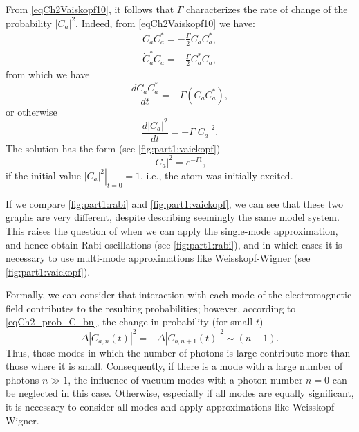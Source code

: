 From \eqref{eqCh2Vaiskopf10}, it follows that $\Gamma$ characterizes the rate of change of the probability $\left|C_{a}\right|^2$. Indeed, from \eqref{eqCh2Vaiskopf10} we have:
\begin{eqnarray}
\dot{C}_{a}C_{a}^{*} = - \frac{\Gamma}{2}C_{a}C_{a}^{*},
\nonumber \\
\dot{C}_{a}^{*}C_{a} = - \frac{\Gamma}{2}C_{a}^{*}C_{a},
\nonumber
\end{eqnarray}
from which we have
\begin{equation}
\frac{d C_{a}C_{a}^{*}}{dt} = -\Gamma \left(C_{a}C_{a}^{*}\right),
\nonumber
\end{equation}
or otherwise
\begin{equation}
\frac{d \left|C_{a}\right|^2}{dt} = -\Gamma \left|C_{a}\right|^2.
\nonumber
\end{equation}
The solution has the form (see \autoref{fig:part1:vaickopf})
\[
\left|C_{a}\right|^2 = e^{- \Gamma t},
\]
if the initial value $\left.\left|C_{a}\right|^2\right|_{t = 0} =
1$, i.e., the atom was initially excited.

 

\begin{remark}
If we compare \autoref{fig:part1:rabi} and
\autoref{fig:part1:vaickopf}, we can see that these two graphs are very different, despite describing seemingly the same model system. This raises the question of when we can apply the single-mode approximation, and hence obtain Rabi oscillations (see \autoref{fig:part1:rabi}), and in which cases it is necessary to use multi-mode approximations like Weisskopf-Wigner (see \autoref{fig:part1:vaickopf}). 

Formally, we can consider that interaction with each mode of the electromagnetic field contributes to the resulting probabilities; however, according to \eqref{eqCh2_prob_C_bn}, the change in probability (for small $t$)
\[
\Delta \left|C_{a, n}\left(t\right)\right|^2 = -\Delta \left|C_{b, n +
  1}\left(t\right)\right|^2 \sim \left(n + 1\right).
\]
Thus, those modes in which the number of photons is large contribute more than those where it is small. Consequently, if there is a mode with a large number of photons $n \gg 1$, the influence of vacuum modes with a photon number $n = 0$ can be neglected in this case. Otherwise, especially if all modes are equally significant, it is necessary to consider all modes and apply approximations like Weisskopf-Wigner.
\end{remark}